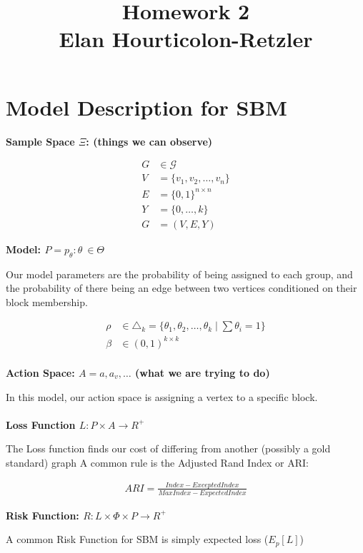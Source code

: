 \documentclass[paper=a4, fontsize=11pt]{scrartcl} %
\title{	
\normalfont \normalsize 
\large{Homework 2} \\ 
Elan Hourticolon-Retzler
}
\date{} %
\numberwithin{equation}{section} %
\numberwithin{figure}{section} %
\numberwithin{table}{section} %
\begin{document}
\maketitle %


\section*{Model Description for SBM}
{\bf Sample Space $\Xi$: (things we can observe)}

\begin{equation}
\begin{split}
G &\in \mathcal{G}\\
V &= \{ v_1,v_2,\dots, v_n \}\\
E &= \{0,1\}^{n\times n }\\
Y &= \{0,\dots, k\}\\
G &= (V, E,Y)
\end{split}
\end{equation}


{\bf Model:  $P = {p_\theta: \theta^{~} \in \Theta}$}

Our model parameters are the probability of being assigned to each group, and the probability of there being an edge between two vertices conditioned on their block membership.

\begin{equation}
\begin{split}
\rho &\in \triangle_k = \{ \theta_1,\theta_2,\dots,\theta_k \mid \sum \theta_i = 1 \}  \\
\beta &\in (0,1)^{k \times k}\\
\end{split}
\end{equation}


{\bf Action Space:  $A = {a, a_v, \dots}$  (what we are trying to do)}

In this model, our action space is assigning a vertex to a specific block.\\
\\
{\bf Loss Function $L: P \times A \rightarrow R^+$ }

The Loss function finds our cost of differing from another (possibly a gold standard) graph
A common rule is the Adjusted Rand Index or ARI:

\begin{equation}
\begin{split}
ARI = \frac{Index - ExceptedIndex}{MaxIndex - ExpectedIndex}
\end{split}
\end{equation}




{\bf Risk Function:	$R: L \times \Phi \times P \rightarrow R^+$}

A common Risk Function for SBM is simply expected loss ($E_p [L]$)
\end{document}
